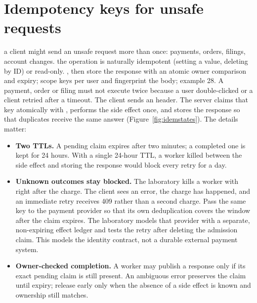 \section{Idempotency keys for unsafe requests}
{a client might send an unsafe request more than once: payments, orders, filings, account changes.}
{the operation is naturally idempotent (setting a value, deleting by ID) or read-only.}
{, then store the response with an atomic owner comparison and expiry; scope keys per user and fingerprint the body; example 28.}
A payment, order or filing must not execute twice because a user double-clicked or a client retried after a timeout. The client sends an  header. The server claims that key atomically with , performs the side effect once, and stores the response so that duplicates receive the same answer (Figure~\ref{fig:idemstates}).
The details matter:
\begin{itemize}
\item \textbf{Two TTLs.} A pending claim expires after two minutes; a completed one is kept for 24 hours. With a single 24-hour TTL, a worker killed between the side effect and storing the response would block every retry for a day.
\item \textbf{Unknown outcomes stay blocked.} The laboratory kills a worker with  right after the charge. The client sees an error, the charge has happened, and an immediate retry receives 409 rather than a second charge. Pass the same key to the payment provider so that its own deduplication covers the window after the claim expires. The laboratory models that provider with a separate, non-expiring effect ledger and tests the retry after deleting the admission claim. This models the identity contract, not a durable external payment system.
\item \textbf{Owner-checked completion.} A worker may publish a response only if its exact pending claim is still present. An ambiguous error preserves the claim until expiry; release early only when the absence of a side effect is known and ownership still matches.
\end{itemize}

